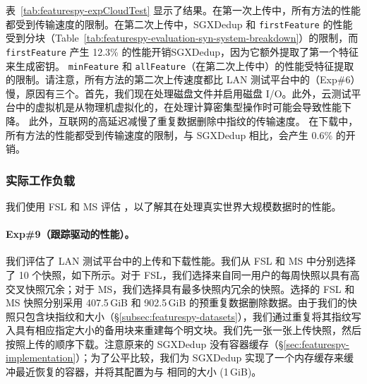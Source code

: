 表~\ref{tab:featurespy-expCloudTest} 显示了结果。在第一次上传中，所有方法的性能都受到传输速度的限制。在第二次上传中，SGXDedup 和 {\tt firstFeature} 的性能受到分块（Table~\ref{tab:featurespy-evaluation-syn-system-breakdown}）的限制，而 {\tt firstFeature} 产生 12.3\% 的性能开销SGXDedup，因为它额外提取了第一个特征来生成密钥。 {\tt minFeature} 和 {\tt allFeature}（在第二次上传中）的性能受特征提取的限制。请注意，所有方法的第二次上传速度都比 LAN 测试平台中的（Exp\#6）慢，原因有三个。首先，我们现在处理磁盘文件并启用磁盘 I/O。此外，云测试平台中的虚拟机是从物理机虚拟化的，在处理计算密集型操作时可能会导致性能下降。
此外，互联网的高延迟减慢了重复数据删除中指纹的传输速度。
在下载中，所有方法的性能都受到传输速度的限制，与 SGXDedup 相比，\prototype 会产生 0.6\% 的开销。


\subsubsection{实际工作负载}
\label{subsec:featurespy-real}
我们使用 FSL 和 MS 评估 \prototype，以了解其在处理真实世界大规模数据时的性能。

\paragraph*{Exp\#9（跟踪驱动的性能）。}
我们评估了 LAN 测试平台中的上传和下载性能。我们从 FSL 和 MS 中分别选择了 10 个快照，如下所示。对于 FSL，我们选择来自同一用户的每周快照以具有高交叉快照冗余；对于 MS，我们选择具有最多快照内冗余的快照。选择的 FSL 和 MS 快照分别采用 407.5\,GiB 和 902.5\,GiB 的预重复数据删除数据。由于我们的快照只包含块指纹和大小（\S\ref{subsec:featurespy-datasets}），我们通过重复将其指纹写入具有相应指定大小的备用块来重建每个明文块。我们先一张一张上传快照，然后按照上传的顺序下载。注意原来的 SGXDedup \cite{ren21} 没有容器缓存（\S\ref{sec:featurespy-implementation}）；为了公平比较，我们为 SGXDedup 实现了一个内存缓存来缓冲最近恢复的容器，并将其配置为与 \prototype 相同的大小 (1\,GiB)。


